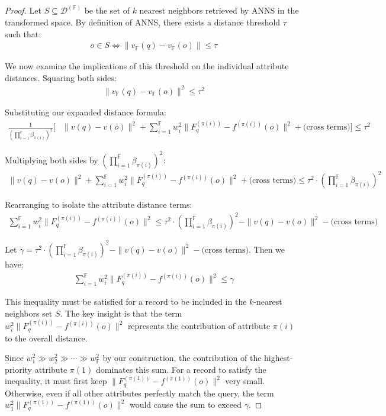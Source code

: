 \documentclass[numbers,sort]{article}
\begin{document}
\begin{proof}
Let $S \subseteq \mathcal{D}^{(\mathbb{F})}$ be the set of $k$ nearest neighbors retrieved by ANNS in the transformed space. By definition of ANNS, there exists a distance threshold $\tau$ such that:
\begin{align}
o \in S \iff \|v_{\mathbb{F}}(q) - v_{\mathbb{F}}(o)\| \leq \tau
\end{align}

We now examine the implications of this threshold on the individual attribute distances. Squaring both sides:
\begin{align}
\|v_{\mathbb{F}}(q) - v_{\mathbb{F}}(o)\|^2 \leq \tau^2
\end{align}

Substituting our expanded distance formula:
\begin{align}
\frac{1}{(\prod_{i=1}^{\mathbb{F}} \beta_{\pi(i)})^2} \Big[&\|v(q) - v(o)\|^2 + \sum_{i=1}^{\mathbb{F}} w_i^2 \|F^{(\pi(i))}_q - f^{(\pi(i))}(o)\|^2 + \text{(cross terms)}\Big] \leq \tau^2
\end{align}

Multiplying both sides by $(\prod_{i=1}^{\mathbb{F}} \beta_{\pi(i)})^2$:
\begin{align}
\|v(q) - v(o)\|^2 + \sum_{i=1}^{\mathbb{F}} w_i^2 \|F^{(\pi(i))}_q - f^{(\pi(i))}(o)\|^2 + \text{(cross terms)} \leq \tau^2 \cdot (\prod_{i=1}^{\mathbb{F}} \beta_{\pi(i)})^2
\end{align}

Rearranging to isolate the attribute distance terms:
\begin{align}
\sum_{i=1}^{\mathbb{F}} w_i^2 \|F^{(\pi(i))}_q - f^{(\pi(i))}(o)\|^2 \leq \tau^2 \cdot (\prod_{i=1}^{\mathbb{F}} \beta_{\pi(i)})^2 - \|v(q) - v(o)\|^2 - \text{(cross terms)}
\end{align}

Let $\gamma = \tau^2 \cdot (\prod_{i=1}^{\mathbb{F}} \beta_{\pi(i)})^2 - \|v(q) - v(o)\|^2 - \text{(cross terms)}$. Then we have:
\begin{align}
\sum_{i=1}^{\mathbb{F}} w_i^2 \|F^{(\pi(i))}_q - f^{(\pi(i))}(o)\|^2 \leq \gamma
\end{align}

This inequality must be satisfied for a record to be included in the $k$-nearest neighbors set $S$. The key insight is that the term $w_i^2 \|F^{(\pi(i))}_q - f^{(\pi(i))}(o)\|^2$ represents the contribution of attribute $\pi(i)$ to the overall distance.

Since $w_1^2 \gg w_2^2 \gg \cdots \gg w_{\mathbb{F}}^2$ by our construction, the contribution of the highest-priority attribute $\pi(1)$ dominates this sum. For a record to satisfy the inequality, it must first keep $\|F^{(\pi(1))}_q - f^{(\pi(1))}(o)\|^2$ very small. Otherwise, even if all other attributes perfectly match the query, the term $w_1^2 \|F^{(\pi(1))}_q - f^{(\pi(1))}(o)\|^2$ would cause the sum to exceed $\gamma$.


\end{proof}
\end{document}
